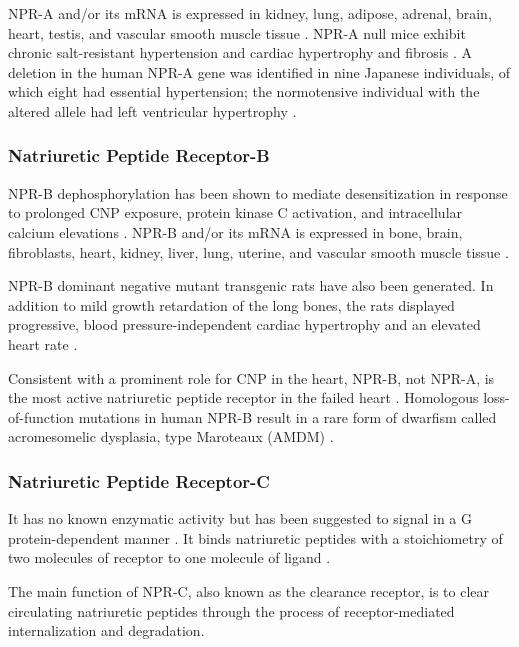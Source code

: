 \documentclass[14pt,a4paper,onecolumn]{extarticle}
\begin{document}
NPR-A and/or its mRNA is expressed in kidney, lung, adipose, adrenal, brain, heart, testis, and vascular smooth muscle tissue \citep{Goy2001}. NPR-A null mice exhibit chronic salt-resistant hypertension and cardiac hypertrophy and fibrosis \citep{Kuhn2002}.  A deletion in the human NPR-A gene was identified in nine Japanese individuals, of which eight had essential hypertension; the normotensive individual with the altered allele had left ventricular hypertrophy \citep{Nakayama2000}.

\subsubsection{Natriuretic Peptide Receptor-B}

NPR-B dephosphorylation has been shown to mediate desensitization in response to prolonged CNP exposure, protein kinase C activation, and intracellular calcium elevations \citep{Potter2000} \citep{Potthast2004}. NPR-B and/or its mRNA is expressed in bone, brain, fibroblasts, heart, kidney, liver, lung, uterine, and vascular smooth muscle tissue \citep{Bryan2006} \citep{Dickey2007}.

NPR-B dominant negative mutant transgenic rats have also been generated. In addition to mild growth retardation of the long bones, the rats displayed progressive, blood pressure-independent cardiac hypertrophy and an elevated heart rate \citep{Langenickel2006}.

Consistent with a prominent role for CNP in the heart, NPR-B, not NPR-A, is the most active natriuretic peptide receptor in the failed heart \citep{Dickey2007}. Homologous loss-of-function mutations in human NPR-B result in a rare form of dwarfism called acromesomelic dysplasia, type Maroteaux (AMDM) \citep{Bartels2004}.

\subsubsection{Natriuretic Peptide Receptor-C}

It has no known enzymatic activity but has been  suggested to signal in a G protein-dependent manner \citep{Rose2008}.
It binds natriuretic peptides with a stoichiometry of two molecules of receptor to one molecule of ligand \citep{Ammarguellat2001}.

The main function of NPR-C, also known as the clearance receptor, is to clear circulating natriuretic peptides through the process of receptor-mediated internalization and degradation.
\end{document}
